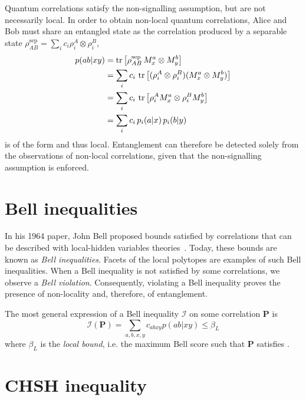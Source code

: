 Quantum correlations satisfy the non-signalling assumption, but are not necessarily local.
In order to obtain non-local quantum correlations, Alice and Bob must share an entangled state as the correlation produced by a separable state $\rho_{AB}^{\mathrm{sep}} = \sum_i c_i \rho^A_i \otimes \rho^B_i$,
\begin{equation}
	\begin{split}
		p(ab|xy) &= \trr{\rho_{AB}^{\mathrm{sep}} \, M^a_x \otimes M^b_y} \\
				 &= \sum_i c_i\, \trr{(\rho^A_i \otimes \rho^B_i) (M^a_x \otimes M^b_y)} \\
				 &= \sum_i c_i\, \trr{\rho^A_i M^a_x \otimes \rho^B_i M^b_y} \\
				 &= \sum_i c_i\, p_i(a|x)\, p_i(b|y)
	\end{split}
\end{equation}
is of the form  and thus local.
Entanglement can therefore be detected solely from the observations of non-local correlations, given that the non-signalling assumption is enforced.

\section{Bell inequalities}

In his 1964 paper, John Bell proposed bounds satisfied by correlations that can be described with local-hidden variables theories~\cite{Bell1964}.
Today, these bounds are known as \textit{Bell inequalities}.
Facets of the local polytopes are examples of such Bell inequalities.
When a Bell inequality is not satisfied by some correlations, we observe a \textit{Bell violation}.
Consequently, violating a Bell inequality proves the presence of non-locality and, therefore, of entanglement.

\medbreak

The most general expression of a Bell inequality $\mathcal{I}$ on some correlation $\mathbf{P}$ is
\begin{equation}
	\mathcal{I}(\mathbf{P}) = \sum_{a,b,x,y}c_{abxy} p(ab|xy) \leq \beta_L
	\label{eq:bell_inequality}
\end{equation}
where $\beta_L$ is the \textit{local bound}, i.e. the maximum Bell score such that $\mathbf{P}$ satisfies .

\section{CHSH inequality}

